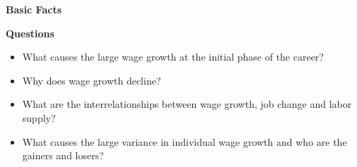\begin{frame}\begin{center}
	\LARGE\textbf{Basic Facts}
\end{center}\end{frame}
\begin{frame}\textbf{Questions}\vspace{0.3cm}

\begin{itemize}\setlength\itemsep{1em}
\item What causes the large wage growth at the initial phase of the career?
\item Why does wage growth decline?
\item What are the interrelationships between wage growth, job change and labor supply?
\item What causes the large variance in individual wage growth and who are the gainers and losers?
\end{itemize}

\end{frame}
